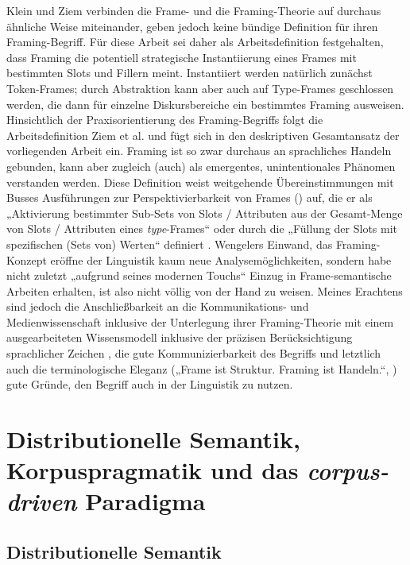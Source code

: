Klein und Ziem verbinden die Frame- und die Framing-Theorie auf durchaus ähnliche Weise miteinander, geben jedoch keine bündige Definition für ihren Framing-Begriff. Für diese Arbeit sei daher als Arbeitsdefinition festgehalten, dass Framing die potentiell strategische Instantiierung eines Frames mit bestimmten Slots und Fillern meint. Instantiiert werden natürlich zunächst Token-Frames; durch Abstraktion kann aber auch auf Type-Frames geschlossen werden, die dann für einzelne Diskursbereiche ein bestimmtes Framing ausweisen. Hinsichtlich der Praxisorientierung des Framing-Begriffs folgt die Arbeitsdefinition Ziem et al. und fügt sich in den deskriptiven Gesamtansatz der vorliegenden Arbeit ein. Framing ist so zwar durchaus an sprachliches Handeln gebunden, kann aber zugleich (auch) als emergentes, unintentionales Phänomen verstanden werden. Diese Definition weist weitgehende Übereinstimmungen mit Busses Ausführungen zur Perspektivierbarkeit von Frames () auf, die er als „Aktivierung bestimmter Sub-Sets von Slots / Attributen aus der Gesamt-Menge von Slots / Attributen eines \emph{type}-Frames`` oder durch die „Füllung der Slots mit spezifischen (Sets von) Werten`` definiert \autocite[622]{busseFrameSemantikKompendium2012}. Wengelers Einwand, das Framing-Konzept eröffne der Linguistik kaum neue Analysemöglichkeiten, sondern habe nicht zuletzt „aufgrund seines modernen Touchs`` \autocite*[27]{wengelerWarnungVorFraming2022} Einzug in Frame-semantische Arbeiten erhalten, ist also nicht völlig von der Hand zu weisen. Meines Erachtens sind jedoch die Anschließbarkeit an die Kommunikations- und Medienwissenschaft inklusive der Unterlegung ihrer Framing-Theorie mit einem ausgearbeiteten Wissensmodell inklusive der präzisen Berücksichtigung sprachlicher Zeichen \autocite[176]{ziemMedienFramesAlsSemantische2018}, die gute Kommunizierbarkeit des Begriffs und letztlich auch die terminologische Eleganz („Frame ist Struktur. Framing ist Handeln.``, \citealt[289]{kleinFrameUndFraming2018}) gute Gründe, den Begriff auch in der Linguistik zu nutzen.

\section[Semantik, Pragmatik und das \emph{corpus-driven} Paradigma]{Distributionelle Semantik, Korpuspragmatik und das \emph{corpus-driven} Paradigma}\label{distributionelle-semantik-korpuspragmatik-und-das-corpus-driven-paradigma}
\subsection{Distributionelle Semantik}\label{distributionelle-semantik}

